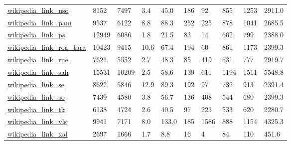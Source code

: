 \begin{longtable}{llllllllll}
 \href{http://konect.cc/networks/wikipedia_link_en}{wikipedia\_link\_nso}                                                     & 8152       & 7497  & 3.4    & 45.0   & 186   & 92     & 855    & 1253   & 2911.0  \\
 \href{http://konect.cc/networks/wikipedia_link_en}{wikipedia\_link\_pam}                                                     & 9537       & 6122  & 8.8    & 88.3   & 252   & 225    & 878    & 1041   & 2685.5  \\
 \href{http://konect.cc/networks/wikipedia_link_en}{wikipedia\_link\_ps}                                                      & 12949      & 6086  & 1.8    & 21.5   & 83    & 14     & 662    & 799    & 2388.0  \\
 \href{http://konect.cc/networks/wikipedia_link_en}{wikipedia\_link\_roa\_tara}                                                & 10423      & 9415  & 10.6   & 67.4   & 194   & 60     & 861    & 1173   & 2399.3  \\
 \href{http://konect.cc/networks/wikipedia_link_en}{wikipedia\_link\_rue}                                                     & 7621       & 5552  & 2.7    & 48.3   & 85    & 419    & 631    & 777    & 2919.7  \\
 \href{http://konect.cc/networks/wikipedia_link_en}{wikipedia\_link\_sah}                                                     & 15531      & 10209 & 2.5    & 58.6   & 139   & 611    & 1194   & 1511   & 5548.8  \\
 \href{http://konect.cc/networks/wikipedia_link_en}{wikipedia\_link\_se}                                                      & 8622       & 5846  & 12.9   & 89.3   & 192   & 97     & 732    & 913    & 2391.4  \\
 \href{http://konect.cc/networks/wikipedia_link_en}{wikipedia\_link\_so}                                                      & 7439       & 4580  & 3.8    & 56.7   & 136   & 408    & 544    & 680    & 2399.3  \\
 \href{http://konect.cc/networks/wikipedia_link_en}{wikipedia\_link\_tk}                                                      & 6138       & 4724  & 2.6    & 40.5   & 97    & 223    & 533    & 620    & 2280.7  \\
 \href{http://konect.cc/networks/wikipedia_link_en}{wikipedia\_link\_vls}                                                     & 9941       & 7171  & 8.0    & 133.0  & 185   & 1586   & 888    & 1154   & 4325.3  \\
 \href{http://konect.cc/networks/wikipedia_link_en}{wikipedia\_link\_xal}                                                     & 2697       & 1666  & 1.7    & 8.8    & 16    & 4      & 84     & 110    & 451.6   \\

\end{longtable}
